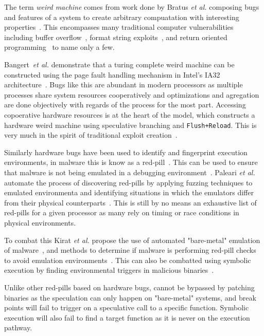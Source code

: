 The term \textit{weird machine} comes from work done by Bratus \textit{et al.}
composing bugs and features of a system to create arbitrary compuatation with 
interesting properties~\cite{weird_machines,bratus2011exploit}. This 
encompasses many traditional computer vulnerabilities including 
buffer overflow~\cite{buffer_overflow}, format string exploits~\cite{format_string_exploit}, 
and return oriented programming~\cite{shacham2007geometry} to name only a few. 

Bangert~\textit{et al.} demonstrate that a turing complete weird machine 
can be constructed using the page fault handling mechanism in Intel's
IA32 architecture~\cite{bangert2013page}. Bugs like this are abundant in
modern processors as multiple processes share system resources cooperatively
and optimizations and agregation are done objectively with regards of the 
process for the most part. Accessing copoerative hardware resources is at
the heart of the \speculake model, which constructs a hardware weird machine
using speculative branching and \texttt{Flush+Reload}. This is 
very much in the spirit of traditional exploit creation~\cite{weird_exploits}.

\smallskip 

Similarly hardware bugs have been used to identify and fingerprint execution
environments, in malware this is know as a red-pill~\cite{red-pill}. This can be used 
to ensure that malware is not being emulated in a debugging 
environment~\cite{lindorfer2011detecting, balzarotti2010efficient}. Paleari 
\textit{et al.} automate the process of discovering red-pills by applying 
fuzzing techniques to emulated environmenta and identifying situations 
in which the emulators differ from their physical counterparts~\cite{paleari2009fistful}.
This is still by no means an exhaustive list of red-pills for a given 
processor as many rely on timing or race conditions in physical 
environments. 

To combat this Kirat \textit{et al.} propose the use of automated "bare-metal" 
emulation of malware~\cite{kirat2011barebox}, and methods to determine if malware
is performing red-pill checks to avoid emulation environments~\cite{kirat2014barecloud}.
This can also be combatted using symbolic execution by finding environmental triggers 
in malicious binaries~\cite{schwartz2010all}. 

\smallskip

Unlike other red-pills based on hardware bugs, \speculake cannot be bypassed
by patching binaries as the speculation can only happen on "bare-metal" systems, 
and break points will fail to trigger on a speculative call to a specific function.
Symbolic execution will also fail to find a target function as it is never on the 
execution pathway. 


